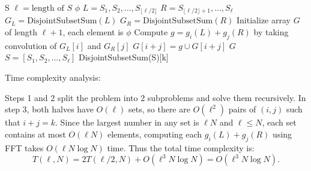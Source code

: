\documentclass[11pt]{article}
\begin{document}
\begin{description}
\begin{enumerate}
  \begin{algorithm}
  \caption{}
  \begin{algorithmic}[1]
     S
    \State $\ell = \text{length of }S$
      \State \Return $\phi$
    \EndIf
    \State $L = S_1, S_2, \ldots, S_{\lfloor\ell/2\rfloor}$
    \State $R = S_{\lfloor\ell/2\rfloor+1}, \ldots, S_\ell$ 
    \State $G_L = \text{DisjointSubsetSum}(L)$
    \State $G_R = \text{DisjointSubsetSum}(R)$
    \State Initialize array $G$ of length $\ell + 1$, each element is $\phi$
          \State Compute $g = g_i(L) + g_j(R)$ by taking convolution of $G_L[i]$ and $G_R[j]$
          \State $G[i+j] = g \cup G[i+j]$
        \EndIf
      \EndFor
    \EndFor
    \State \Return $G$
    \EndFunction
    \State $S = [S_1, S_2, \ldots, S_\ell]$
    \State \Return DisjointSubsetSum(S)[k]
  \end{algorithmic}
  \end{algorithm}

  Time complexity analysis:

  Steps 1 and 2 split the problem into 2 subproblems and solve them recursively. 
  In step 3, both halves have $O(\ell)$ sets, 
  so there are $O(\ell^2)$ pairs of $(i,j)$ such that $i+j=k$.
  Since the largest number in any set is $\ell N$ and $\ell \le N$, 
  each set contains at most $O(\ell N)$ elements, 
  computing each $g_i(L) + g_j(R)$ using FFT takes $O(\ell N\log N)$ time. 
  Thus the total time complexity is:
  \begin{equation}
    T(\ell, N) = 2T(\ell/2, N) + O(\ell^3N\log N) = O(\ell^3N\log N).
  \end{equation}


\end{enumerate}
\end{description}
\end{document}
